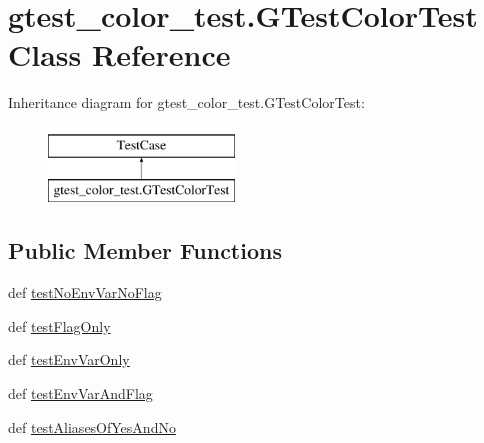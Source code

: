 \hypertarget{classgtest__color__test_1_1_g_test_color_test}{\section{gtest\-\_\-color\-\_\-test.\-G\-Test\-Color\-Test Class Reference}
\label{classgtest__color__test_1_1_g_test_color_test}
}
Inheritance diagram for gtest\-\_\-color\-\_\-test.\-G\-Test\-Color\-Test\-:\begin{figure}[H]
\begin{center}
\leavevmode
\includegraphics[height=2.000000cm]{classgtest__color__test_1_1_g_test_color_test}
\end{center}
\end{figure}
\subsection*{Public Member Functions}
\begin{DoxyCompactItemize}
\item 
def \hyperlink{classgtest__color__test_1_1_g_test_color_test_aea5ca1873661e507d702d861154f8114}{test\-No\-Env\-Var\-No\-Flag}
\item 
def \hyperlink{classgtest__color__test_1_1_g_test_color_test_a95c73e043988e6139e4643f5bde768f3}{test\-Flag\-Only}
\item 
def \hyperlink{classgtest__color__test_1_1_g_test_color_test_a9fae1f85474adca3de92ee649e080ad0}{test\-Env\-Var\-Only}
\item 
def \hyperlink{classgtest__color__test_1_1_g_test_color_test_a432cb9355fa95fe6be30f6e9bbf4b8b4}{test\-Env\-Var\-And\-Flag}
\item 
def \hyperlink{classgtest__color__test_1_1_g_test_color_test_a393af86f00d8566638a854fb46736a87}{test\-Aliases\-Of\-Yes\-And\-No}
\end{DoxyCompactItemize}


